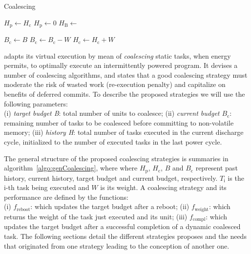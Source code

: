 \begin{algorithm}
	\caption{Coalescing}
	\label{algo:genCoalescing}
	\scriptsize
	\begin{algorithmic}[1]
        \State $H_\text{p} \gets H_\text{c}$
        \State $H_\text{p} \gets 0$ 
        \State $H_\text{B} \leftarrow $ 

	        \State $ B_\text{c} \gets B$
		        \State {}
		        \State $B_\text{c} \gets B_\text{c} - W$
				\State $H_\text{c} \gets H_\text{c} + W$
	        \EndWhile
	        \State {}
        \EndWhile
	\end{algorithmic}
\end{algorithm}

\sys adapts its virtual execution by mean of \emph{coalescing} static tasks, when energy permits, to optimally execute an intermittently powered program. It devises a number of coalescing algorithms, and states that a good coalescing strategy must moderate the risk of wasted work (re-execution penalty) and capitalize on benefits of deferred commits. To describe the proposed strategies we will use the following parameters: \\
(i) \textit{target budget B}: total number of units to coalesce; (ii) \textit{current budget $B_\text{c}$}: remaining number of tasks to be coalesced before committing to non-volatile memory; (iii) \textit{history H}: total number of tasks executed in the current discharge cycle, initialized to the number of executed tasks in the last power cycle. 

The general structure of the proposed coalescing strategies is summaries in algorithm~\ref{algo:genCoalescing}, where where $H_\text{p}$, $H_\text{c}$, $B$ and $B_\text{c}$ represent past history, current history, target budget and current budget, respectively. $T_\text{i}$ is the i-th task being executed and $W$ is its weight.
A coalescing strategy and its performance are defined by the functions: \\
(i) \emph{$f_\text{reboot}$}: which updates the target budget after a reboot; (ii) \emph{$f_\text{weight}$}: which returns the weight of the task just executed and its unit; (iii) \emph{$f_\text{compl}$}: which updates the target budget after a successful completion of a dynamic coalesced task. The following sections detail the different strategies \sys proposes and the needs that originated from one strategy leading to the conception of another one.

